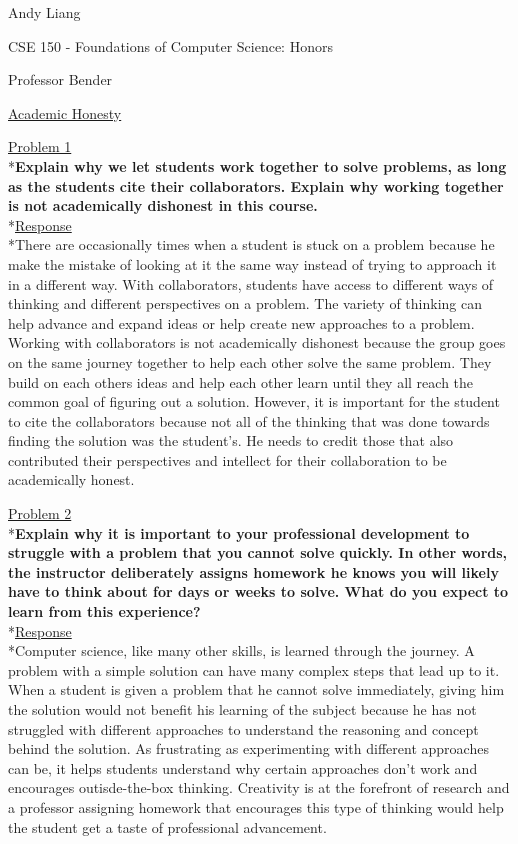 \documentclass[11pt]{article}
\begin{document}
\begin{flushleft}
Andy Liang

CSE 150 - Foundations of Computer Science: Honors

Professor Bender
\end{flushleft}
\medskip
\centerline{\uline{Academic Honesty}}
\bigskip\bigskip

\noindent
\uline{Problem 1}
\\*\textbf{Explain why we let students work together to solve problems, as long as the students cite their
collaborators. Explain why working together is not academically dishonest in this course.}
\medskip
\\*\uline{Response}
\\*There are occasionally times when a student is stuck on a problem because he make the mistake of looking at it the same way instead of trying to approach it in a different way. With collaborators, students have access to different ways of thinking and different perspectives on a problem. The variety of thinking can help advance and expand ideas or help create new approaches to a problem. Working with collaborators is not academically dishonest because the group goes on the same journey together to help each other solve the same problem. They build on each others ideas and help each other learn until they all reach the common goal of figuring out a solution. However, it is important for the student to cite the collaborators because not all of the thinking that was done towards finding the solution was the student's. He needs to credit those that also contributed their perspectives and intellect for their collaboration to be academically honest.
\bigskip\bigskip

\noindent
\uline{Problem 2}
\\*\textbf{Explain why it is important to your professional development to struggle with a problem that you
cannot solve quickly. In other words, the instructor deliberately assigns homework he knows you
will likely have to think about for days or weeks to solve. What do you expect to learn from this
experience?}
\medskip
\\*\uline{Response}
\\*Computer science, like many other skills, is learned through the journey. A problem with a simple solution can have many complex steps that lead up to it. When a student is given a problem that he cannot solve immediately, giving him the solution would not benefit his learning of the subject because he has not struggled with different approaches to understand the reasoning and concept behind the solution. As frustrating as experimenting with different approaches can be, it helps students understand why certain approaches don't work and encourages outisde-the-box thinking. Creativity is at the forefront of research and a professor assigning homework that encourages this type of thinking would help the student get a taste of professional advancement. 
\end{document}
